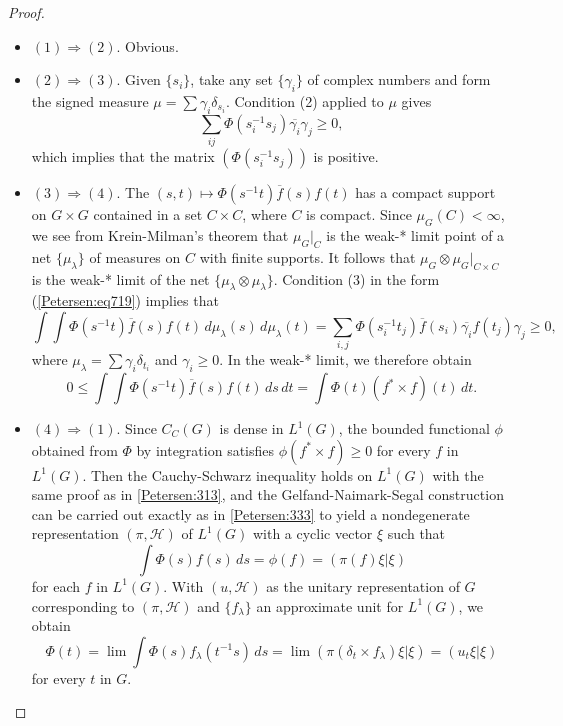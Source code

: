 \documentclass{book}
\begin{document}
\begin{proof}
  \begin{itemize}
    \item \((1)\Rightarrow (2)\). Obvious.
    \item \((2)\Rightarrow (3)\). Given \(\{s_i\}\), take any set \(\{\gamma_i\}\) of complex numbers and form the 
      signed measure \(\mu=\sum\gamma_i\delta_{s_i}\). Condition (2) applied to \(\mu\) gives
      \begin{equation}\label{Petersen:eq719}
        \sum_{ij}\Phi(s^{-1}_i s_j)\overline{\gamma_i}\gamma_j\geq 0,
      \end{equation}
      which implies that the matrix \((\Phi(s_i^{-1}s_j))\) is positive.
    \item \((3)\Rightarrow (4)\). The \((s,t)\mapsto\Phi(s^{-1}t)\overline{f}(s)f(t)\) has a compact support 
      on \(G\times G\) contained in a set \(C\times C\), where \(C\) is compact. Since \(\mu_G(C)<\infty\), we see from Krein-Milman's theorem
      that \(\mu_G|_C\) is the weak-* limit point of a net \(\{\mu_\lambda\}\) of measures
      on \(C\) with finite supports. It follows that \(\mu_G\otimes\mu_G|_{C\times C}\) is the 
      weak-* limit of the net \(\{\mu_\lambda\otimes\mu_\lambda\}\). Condition (3) in the form (\ref{Petersen:eq719}) implies that
      \[
        \int\int\Phi(s^{-1}t)\overline{f}(s)f(t)\,d\mu_\lambda(s)\,d\mu_\lambda(t)=\sum_{i,j}\Phi(s_i^{-1}t_j)\overline{f}(s_i)\overline{\gamma_i}f(t_j)\gamma_j\geq 0,
      \]
      where \(\mu_\lambda=\sum\gamma_i\delta_{t_i}\) and \(\gamma_i\geq 0\). In the weak-* limit, we therefore obtain
      \[
        0\leq\int\int\Phi(s^{-1}t)\overline{f}(s)f(t)\,ds\,dt=\int\Phi(t)(f^*\times f)(t)\,dt.
      \]
    \item \((4)\Rightarrow (1)\). Since \(C_C(G)\) is dense in \(L^1(G)\), the bounded functional \(\phi\) obtained 
      from \(\Phi\) by integration satisfies \(\phi(f^*\times f)\geq 0\) for every \(f\) in \(L^1(G)\).
      Then the Cauchy-Schwarz inequality holds on \(L^1(G)\) with the same proof as in \ref{Petersen:313}, and the Gelfand-Naimark-Segal construction
      can be carried out exactly as in \ref{Petersen:333} to yield a nondegenerate representation \((\pi,\mathcal{H})\)
      of \(L^1(G)\) with a cyclic vector \(\xi\) such that
      \[
        \int\Phi(s)f(s)\,ds=\phi(f)=(\pi(f)\xi|\xi)
      \]  
      for each \(f\) in \(L^1(G)\). With \((u,\mathcal{H})\) as the unitary representation of \(G\)
      corresponding to \((\pi,\mathcal{H})\) and \(\{f_\lambda\}\) an approximate unit for \(L^1(G)\), we obtain
      \[
        \Phi(t)=\lim\int\Phi(s)f_\lambda(t^{-1}s)\,ds=\lim(\pi(\delta_t\times f_\lambda)\xi|\xi)=(u_t\xi|\xi)
      \]
      for every \(t\) in \(G\).
  \end{itemize}
\end{proof}
\end{document}
